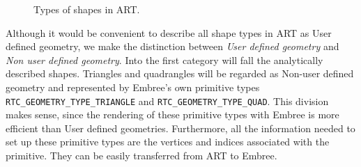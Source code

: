 \begin{figure}[!tbp]
	\centering
	\hfill
	\hfill
	\caption{Types of shapes in ART.}
	\label{fig:shape_types}
\end{figure}

Although it would be convenient to describe all shape types in ART as User defined geometry, we make the distinction between \emph{User defined geometry} and \emph{Non user defined geometry}. Into the first category will fall the analytically described shapes. Triangles and quadrangles will be regarded as Non-user defined geometry and represented by Embree's own primitive types \texttt{RTC\_GEOMETRY\_TYPE\_TRIANGLE} and \texttt{RTC\_GEOMETRY\_TYPE\_QUAD}. This division makes sense, since the rendering of these primitive types with Embree is more efficient than User defined geometries. Furthermore, all the information needed to set up these primitive types are the vertices and indices associated with the primitive. They can be easily transferred from ART to Embree. 

